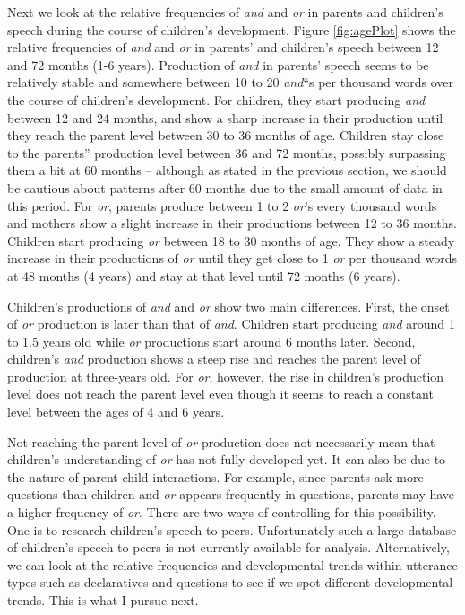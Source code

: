 \documentclass[floatsintext,man]{apa6}
\theoremstyle{definition}
\theoremstyle{definition}
\theoremstyle{definition}
\theoremstyle{remark}
\begin{document}
Next we look at the relative frequencies of \emph{and} and \emph{or} in
parents and children's speech during the course of children's
development. Figure \ref{fig:agePlot} shows the relative frequencies of
\emph{and} and \emph{or} in parents' and children's speech between 12
and 72 months (1-6 years). Production of \emph{and} in parents' speech
seems to be relatively stable and somewhere between 10 to 20
\emph{and}\enquote{s per thousand words over the course of children's
development. For children, they start producing \emph{and} between 12
and 24 months, and show a sharp increase in their production until they
reach the parent level between 30 to 36 months of age. Children stay
close to the parents} production level between 36 and 72 months,
possibly surpassing them a bit at 60 months -- although as stated in the
previous section, we should be cautious about patterns after 60 months
due to the small amount of data in this period. For \emph{or}, parents
produce between 1 to 2 \emph{or}'s every thousand words and mothers show
a slight increase in their productions between 12 to 36 months. Children
start producing \emph{or} between 18 to 30 months of age. They show a
steady increase in their productions of \emph{or} until they get close
to 1 \emph{or} per thousand words at 48 months (4 years) and stay at
that level until 72 months (6 years).

Children's productions of \emph{and} and \emph{or} show two main
differences. First, the onset of \emph{or} production is later than that
of \emph{and}. Children start producing \emph{and} around 1 to 1.5 years
old while \emph{or} productions start around 6 months later. Second,
children's \emph{and} production shows a steep rise and reaches the
parent level of production at three-years old. For \emph{or}, however,
the rise in children's production level does not reach the parent level
even though it seems to reach a constant level between the ages of 4 and
6 years.

Not reaching the parent level of \emph{or} production does not
necessarily mean that children's understanding of \emph{or} has not
fully developed yet. It can also be due to the nature of parent-child
interactions. For example, since parents ask more questions than
children and \emph{or} appears frequently in questions, parents may have
a higher frequency of \emph{or}. There are two ways of controlling for
this possibility. One is to research children's speech to peers.
Unfortunately such a large database of children's speech to peers is not
currently available for analysis. Alternatively, we can look at the
relative frequencies and developmental trends within utterance types
such as declaratives and questions to see if we spot different
developmental trends. This is what I pursue next.
\end{document}
